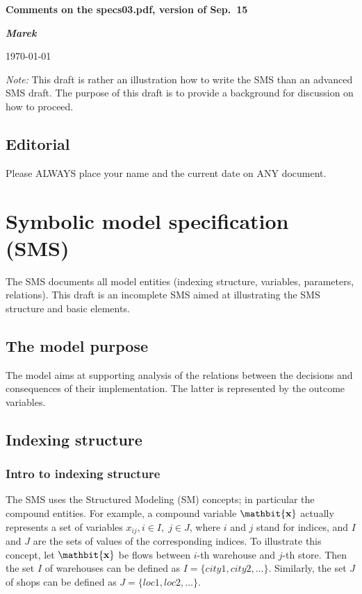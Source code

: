 \documentclass[a4paper,12pt]{article}
\def\vv#1{\ensuremath{\mathbit{\bf #1}}}
\begin{document}
\thispagestyle{empty}
\pagestyle{plain}
\centerline{\Large\bf Comments on the specs03.pdf, version of Sep.~15}
\bigskip

\centerline{\large\bf {\em Marek}}
\bigskip

\centerline{\sc \today}

\bigskip
\bigskip

{\em Note:} This draft is rather an illustration how to write the SMS
than an advanced SMS draft.
The purpose of this draft is to provide a background for discussion on how
to proceed.

\subsection*{Editorial}
Please ALWAYS place your name and the current date on ANY document.

\section{Symbolic model specification (SMS)}
The SMS documents all model entities (indexing structure, variables,
parameters, relations).
This draft is an incomplete SMS aimed at illustrating the SMS structure
and basic elements.

\subsection{The model purpose}
The model aims at supporting analysis of the relations between the decisions
and consequences of their implementation.
The latter is represented by the outcome variables.

\subsection{Indexing structure}
\subsubsection{Intro to indexing structure}
The SMS uses the Structured Modeling (SM) concepts; in particular the
compound entities.
For example, a compound variable $\vv{x}$ actually represents a set of variables
$x_{ij}, i \in I,\; j \in J$, where $i$ and $j$ stand for indices, and $I$ and
$J$ are the sets of values of the corresponding indices.
To illustrate this concept, let $\vv{x}$ be flows between $i$-th warehouse
and $j$-th store.
Then the set $I$ of warehouses can be defined as $I = \{city1, city2, \dots\}$.
Similarly, the set $J$ of shops can be defined as $J = \{loc1, loc2, \dots\}$.
\end{document}
